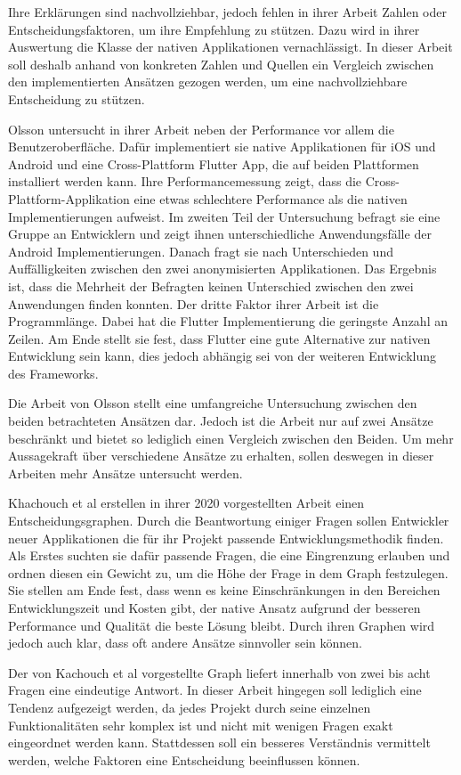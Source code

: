 Ihre Erklärungen sind nachvollziehbar, jedoch fehlen in ihrer Arbeit Zahlen oder Entscheidungsfaktoren, um ihre Empfehlung zu stützen. Dazu wird in ihrer Auswertung die Klasse der nativen Applikationen vernachlässigt. In dieser Arbeit soll deshalb anhand von konkreten Zahlen und Quellen ein Vergleich zwischen den implementierten Ansätzen gezogen werden, um eine nachvollziehbare Entscheidung zu stützen.

Olsson \cite{Olsson_2020} untersucht in ihrer Arbeit neben der Performance vor allem die Benutzeroberfläche. Dafür implementiert sie native Applikationen für iOS und Android und eine Cross-Plattform Flutter App, die auf beiden Plattformen installiert werden kann. Ihre Performancemessung zeigt, dass die Cross-Plattform-Applikation eine etwas schlechtere Performance als die nativen Implementierungen aufweist. Im zweiten Teil der Untersuchung befragt sie eine Gruppe an Entwicklern und zeigt ihnen unterschiedliche Anwendungsfälle der Android Implementierungen. Danach fragt sie nach Unterschieden und Auffälligkeiten zwischen den zwei anonymisierten Applikationen. Das Ergebnis ist, dass die Mehrheit der Befragten keinen Unterschied zwischen den zwei Anwendungen finden konnten. Der dritte Faktor ihrer Arbeit ist die Programmlänge. Dabei hat die Flutter Implementierung die geringste Anzahl an Zeilen. Am Ende stellt sie fest, dass Flutter eine gute Alternative zur nativen Entwicklung sein kann, dies jedoch abhängig sei von der weiteren Entwicklung des Frameworks.
\newline

Die Arbeit von Olsson \cite{Olsson_2020} stellt eine umfangreiche Untersuchung zwischen den beiden betrachteten Ansätzen dar. Jedoch ist die Arbeit nur auf zwei Ansätze beschränkt und bietet so lediglich einen Vergleich zwischen den Beiden. Um mehr Aussagekraft über verschiedene Ansätze zu erhalten, sollen deswegen in dieser Arbeiten mehr Ansätze untersucht werden. 

Khachouch et al \cite{IEEE_Khackouch_Al} erstellen in ihrer 2020 vorgestellten Arbeit einen Entscheidungsgraphen. Durch die Beantwortung einiger Fragen sollen Entwickler neuer Applikationen die für ihr Projekt passende Entwicklungsmethodik finden. Als Erstes suchten sie dafür passende Fragen, die eine Eingrenzung erlauben und ordnen diesen ein Gewicht zu, um die Höhe der Frage in dem Graph festzulegen. Sie stellen am Ende fest, dass wenn es keine Einschränkungen in den Bereichen Entwicklungszeit und Kosten gibt, der native Ansatz aufgrund der besseren Performance und Qualität die beste Lösung bleibt. Durch ihren Graphen wird jedoch auch klar, dass oft andere Ansätze sinnvoller sein können.

Der von Kachouch et al \cite{IEEE_Khackouch_Al} vorgestellte Graph liefert innerhalb von zwei bis acht Fragen eine eindeutige Antwort. In dieser Arbeit hingegen soll lediglich eine Tendenz aufgezeigt werden, da jedes Projekt durch seine einzelnen Funktionalitäten sehr komplex ist und nicht mit wenigen Fragen exakt eingeordnet werden kann. Stattdessen soll ein besseres Verständnis vermittelt werden, welche Faktoren eine Entscheidung beeinflussen können. 